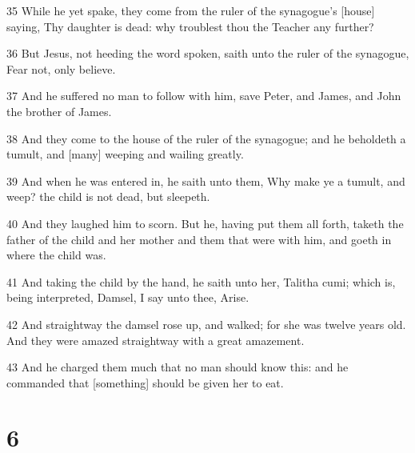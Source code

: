 \par 35 While he yet spake, they come from the ruler of the synagogue's [house] saying, Thy daughter is dead: why troublest thou the Teacher any further?
\par 36 But Jesus, not heeding the word spoken, saith unto the ruler of the synagogue, Fear not, only believe.
\par 37 And he suffered no man to follow with him, save Peter, and James, and John the brother of James.
\par 38 And they come to the house of the ruler of the synagogue; and he beholdeth a tumult, and [many] weeping and wailing greatly.
\par 39 And when he was entered in, he saith unto them, Why make ye a tumult, and weep? the child is not dead, but sleepeth.
\par 40 And they laughed him to scorn. But he, having put them all forth, taketh the father of the child and her mother and them that were with him, and goeth in where the child was.
\par 41 And taking the child by the hand, he saith unto her, Talitha cumi; which is, being interpreted, Damsel, I say unto thee, Arise.
\par 42 And straightway the damsel rose up, and walked; for she was twelve years old. And they were amazed straightway with a great amazement.
\par 43 And he charged them much that no man should know this: and he commanded that [something] should be given her to eat.

\chapter{6}


